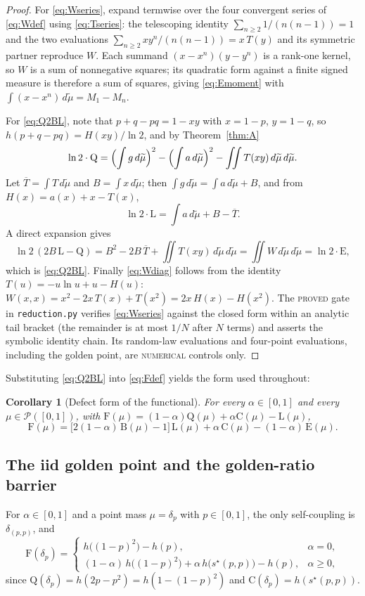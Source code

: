 \documentclass[11pt]{article}
\theoremstyle{plain}
\newtheorem{corollary}[theorem]{Corollary}
\theoremstyle{definition}
\theoremstyle{remark}
\newcommand{\PP}{\mathcal P}
\newcommand{\sstar}{s^{\star}}
\newcommand{\Lb}{\mathrm{L}}
\newcommand{\Bb}{\mathrm{B}}
\newcommand{\Cc}{\mathrm{C}}
\newcommand{\Qq}{\mathrm{Q}}
\newcommand{\Ee}{\mathrm{E}}
\newcommand{\Ff}{\mathrm{F}}
\newcommand{\PROVED}{\textsc{proved}}
\newcommand{\NUMERICAL}{\textsc{numerical}}
\begin{document}
\begin{proof}
For \eqref{eq:Wseries}, expand termwise over the four convergent series of
\eqref{eq:Wdef} using \eqref{eq:Tseries}: the telescoping identity
$\sum_{n\ge2}1/(n(n-1))=1$ and the two evaluations
$\sum_{n\ge2}x y^n/(n(n-1))=x\,T(y)$ and its symmetric partner reproduce
$W$. Each summand $(x-x^n)(y-y^n)$ is a rank-one kernel, so $W$ is a sum
of nonnegative squares; its quadratic form against a finite signed measure is
therefore a sum of squares, giving \eqref{eq:Emoment} with
$\int(x-x^n)\,d\widetilde\mu=M_1-M_n$.

For \eqref{eq:Q2BL}, note that $p+q-pq=1-xy$ with $x=1-p$, $y=1-q$,
so $h(p+q-pq)=H(xy)/\ln2$, and by Theorem~\ref{thm:A}
\[
\ln2\cdot\Qq = \Bigl(\int g\,d\widetilde\mu\Bigr)^2
-\Bigl(\int a\,d\widetilde\mu\Bigr)^2-\iint T(xy)\,d\widetilde\mu\,
d\widetilde\mu .
\]
Let $\overline T=\int T\,d\widetilde\mu$ and $B=\int x\,d\widetilde\mu$;
then $\int g\,d\widetilde\mu=\int a\,d\widetilde\mu+B$, and from
$H(x)=a(x)+x-T(x)$,
\[
\ln2\cdot\Lb=\int a\,d\widetilde\mu+B-\overline T .
\]
A direct expansion gives
\[
\ln2\,(2B\,\Lb-\Qq)
=B^2-2B\,\overline T+\iint T(xy)\,d\widetilde\mu\,d\widetilde\mu
=\iint W\,d\widetilde\mu\,d\widetilde\mu=\ln2\cdot\Ee,
\]
which is \eqref{eq:Q2BL}. Finally
\eqref{eq:Wdiag} follows from the identity
$T(u)=-u\ln u+u-H(u)$:
$W(x,x)=x^2-2x\,T(x)+T(x^2)=2x\,H(x)-H(x^2)$.
The \PROVED{} gate in \texttt{reduction.py} verifies
\eqref{eq:Wseries} against the closed form within an analytic tail bracket
(the remainder is at most $1/N$ after $N$ terms) and asserts the symbolic
identity chain.  Its random-law evaluations and four-point evaluations,
including the golden point, are \NUMERICAL{} controls only.
\end{proof}

Substituting \eqref{eq:Q2BL} into \eqref{eq:Fdef} yields the form used
throughout:

\begin{corollary}[Defect form of the functional]
\label{cor:Fid}
For every $\alpha\in[0,1]$ and every $\mu\in\PP([0,1])$, with
$\Ff(\mu)=(1-\alpha)\Qq(\mu)+\alpha\Cc(\mu)-\Lb(\mu)$,
\begin{equation}
\Ff(\mu)=\bigl[2(1-\alpha)\,\Bb(\mu)-1\bigr]\,\Lb(\mu)
+\alpha\,\Cc(\mu)-(1-\alpha)\,\Ee(\mu).
\label{eq:Fid}
\end{equation}
\end{corollary}

\subsection{The iid golden point and the golden-ratio barrier}
For $\alpha\in[0,1]$ and a point mass $\mu=\delta_p$ with $p\in[0,1]$,
the only self-coupling is $\delta_{(p,p)}$, and
\begin{equation}
\Ff(\delta_p)=\begin{cases}
h\bigl((1-p)^2\bigr)-h(p),&\alpha=0,\\
(1-\alpha)\,h\bigl((1-p)^2\bigr)+\alpha\,h\bigl(\sstar(p,p)\bigr)-h(p),
&\alpha\ge0,
\end{cases}
\label{eq:Fpoint}
\end{equation}
since $\Qq(\delta_p)=h(2p-p^2)=h(1-(1-p)^2)$ and $\Cc(\delta_p)=
h(\sstar(p,p))$.
\end{document}
